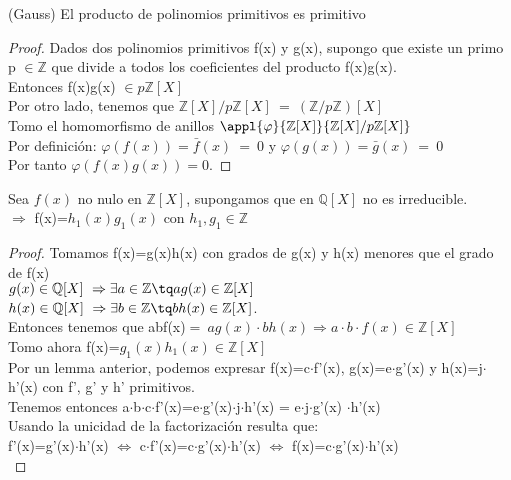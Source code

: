\documentclass[nochap]{apuntes}
\begin{document}
\obs(Gauss) El producto de polinomios primitivos es primitivo
\begin{proof}
 Dados dos polinomios primitivos f(x) y g(x), supongo que existe un primo p $\in \mathbb{Z}$  que divide a todos los coeficientes del producto
 f(x)g(x).\\
 Entonces f(x)g(x) $\in p\mathbb{Z}[X]$\\
 Por otro lado, tenemos que $\mathbb{Z}[X]/p\mathbb{Z}[X] \ = \ (\mathbb{Z}/p\mathbb{Z})[X]$\\
 Tomo el homomorfismo de anillos $\appl{\varphi}{\mathbb{Z}[X]}{\mathbb{Z}[X]/p\mathbb{Z}[X]}$\\
 Por definición: $\varphi(f(x))=\bar{f}(x) \ = \ 0$  y $\varphi(g(x))=\bar{g}(x) \ = \ 0$\\
 Por tanto $\varphi(f(x)g(x))=0$.
\end{proof}

\begin{lemma}
 Sea $f(x)$ no nulo en $\mathbb{Z}[X]$, supongamos que en $\mathbb{Q}[X]$  no es irreducible.\\
 $\Rightarrow$  f(x)=$h_1(x)g_1(x)$  con $h_1, g_1 \in \mathbb{Z}$
\end{lemma}

\begin{proof}
 Tomamos f(x)=g(x)h(x) con grados de g(x) y h(x) menores que el grado de f(x)\\
 
 $g(x)\in\mathbb{Q}[X] \ \Rightarrow \exists a \in \mathbb{Z} \tq ag(x) \in \mathbb{Z}[X]$\\
 $h(x)\in\mathbb{Q}[X] \ \Rightarrow \exists b \in \mathbb{Z} \tq bh(x) \in \mathbb{Z}[X]$.\\
 Entonces tenemos que abf(x)$= \ ag(x)\cdot bh(x) \Rightarrow a\cdot b\cdot f(x) \in \mathbb{Z}[X]$\\
 
 Tomo ahora f(x)=$g_1(x)h_1(x) \in \mathbb{Z}[X]$\\
 Por un lemma anterior, podemos expresar f(x)=c$\cdot$f'(x), g(x)=e$\cdot$g'(x) y h(x)=j$\cdot$h'(x) con f', g' y h' primitivos.\\
 
 Tenemos entonces a$\cdot$b$\cdot$c$\cdot$f'(x)=e$\cdot$g'(x)$\cdot$j$\cdot$h'(x) =  e$\cdot$j$\cdot$g'(x) $\cdot$h'(x)\\
 Usando la unicidad de la factorización resulta que:\\
 f'(x)=g'(x)$\cdot$h'(x) $\Leftrightarrow$  c$\cdot$f'(x)=c$\cdot$g'(x)$\cdot$h'(x) $\Leftrightarrow$ f(x)=c$\cdot$g'(x)$\cdot$h'(x)\\
\end{proof}
\end{document}
